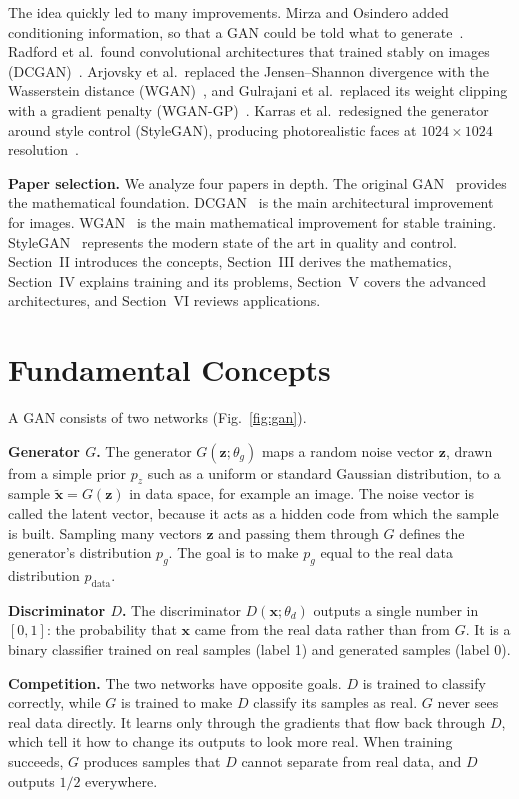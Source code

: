 \documentclass[conference]{IEEEtran}
\newcommand{\pdata}{p_{\mathrm{data}}}
\begin{document}
The idea quickly led to many improvements. Mirza and Osindero added conditioning information, so that a GAN could be told what to generate~\cite{mirza2014}. Radford et al.\ found convolutional architectures that trained stably on images (DCGAN)~\cite{radford2016}. Arjovsky et al.\ replaced the Jensen--Shannon divergence with the Wasserstein distance (WGAN)~\cite{arjovsky2017}, and Gulrajani et al.\ replaced its weight clipping with a gradient penalty (WGAN-GP)~\cite{gulrajani2017}. Karras et al.\ redesigned the generator around style control (StyleGAN), producing photorealistic faces at $1024\times1024$ resolution~\cite{karras2019}.

\textbf{Paper selection.} We analyze four papers in depth. The original GAN~\cite{goodfellow2014} provides the mathematical foundation. DCGAN~\cite{radford2016} is the main architectural improvement for images. WGAN~\cite{arjovsky2017} is the main mathematical improvement for stable training. StyleGAN~\cite{karras2019} represents the modern state of the art in quality and control. Section~II introduces the concepts, Section~III derives the mathematics, Section~IV explains training and its problems, Section~V covers the advanced architectures, and Section~VI reviews applications.

\section{Fundamental Concepts}
A GAN consists of two networks (Fig.~\ref{fig:gan}).

\textbf{Generator $G$.} The generator $G(\mathbf{z};\theta_g)$ maps a random noise vector $\mathbf{z}$, drawn from a simple prior $p_z$ such as a uniform or standard Gaussian distribution, to a sample $\tilde{\mathbf{x}}=G(\mathbf{z})$ in data space, for example an image. The noise vector is called the latent vector, because it acts as a hidden code from which the sample is built. Sampling many vectors $\mathbf{z}$ and passing them through $G$ defines the generator's distribution $p_g$. The goal is to make $p_g$ equal to the real data distribution $\pdata$.

\textbf{Discriminator $D$.} The discriminator $D(\mathbf{x};\theta_d)$ outputs a single number in $[0,1]$: the probability that $\mathbf{x}$ came from the real data rather than from $G$. It is a binary classifier trained on real samples (label 1) and generated samples (label 0).

\textbf{Competition.} The two networks have opposite goals. $D$ is trained to classify correctly, while $G$ is trained to make $D$ classify its samples as real. $G$ never sees real data directly. It learns only through the gradients that flow back through $D$, which tell it how to change its outputs to look more real. When training succeeds, $G$ produces samples that $D$ cannot separate from real data, and $D$ outputs $1/2$ everywhere.
\end{document}
